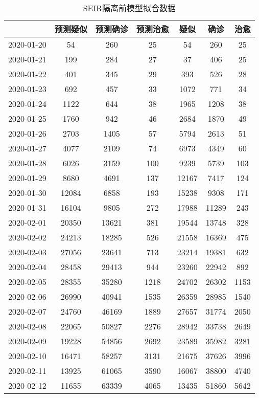 \begin{longtable}{ccccccc}
\caption{SEIR隔离前模型拟合数据}\\
\hline
&预测疑似&预测确诊&预测治愈&疑似&确诊&治愈\\
\hline
2020-01-20&54&260&25&54&260&25\\
2020-01-21&199&284&27&37&406&25\\
2020-01-22&401&345&29&393&526&28\\
2020-01-23&692&457&33&1072&771&34\\
2020-01-24&1122&644&38&1965&1208&38\\
2020-01-25&1760&942&46&2684&1870&49\\
2020-01-26&2703&1405&57&5794&2613&51\\
2020-01-27&4077&2109&74&6973&4349&60\\
2020-01-28&6026&3159&100&9239&5739&103\\
2020-01-29&8680&4691&137&12167&7417&124\\
2020-01-30&12084&6858&193&15238&9308&171\\
2020-01-31&16104&9805&272&17988&11289&243\\
2020-02-01&20350&13621&381&19544&13748&328\\
2020-02-02&24213&18285&526&21558&16369&475\\
2020-02-03&27056&23641&713&23214&19381&632\\
2020-02-04&28458&29413&944&23260&22942&892\\
2020-02-05&28355&35280&1218&24702&26302&1153\\
2020-02-06&26990&40941&1535&26359&28985&1540\\
2020-02-07&24760&46169&1889&27657&31774&2050\\
2020-02-08&22065&50827&2276&28942&33738&2649\\
2020-02-09&19228&54856&2692&23589&35982&3281\\
2020-02-10&16471&58257&3131&21675&37626&3996\\
2020-02-11&13925&61065&3590&16067&38800&4740\\
2020-02-12&11655&63339&4065&13435&51860&5642\\
\hline
\end{longtable}